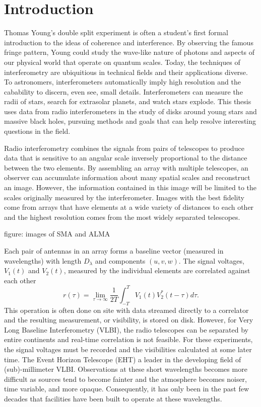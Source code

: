 \chapter{Introduction}\label{chapter:introduction}

Thomas Young's double split experiment is often a student's first formal introduction to the ideas of 
coherence and interference.  By observing the famous fringe pattern, Young could study the wave-like nature of 
photons and aspects of our physical world that operate on quantum scales.  Today, the techniques of interferometry
are ubiquitious in technical fields and their applications diverse.  To astronomers, interferometers automatically
imply high resolution and the cabability to discern, even see, small details.  Interferometers can measure the 
radii of stars, search for extrasolar planets, and watch stars explode. This thesis uses data from radio
interferometers in the study of disks around young stars and massive black holes, pursuing methods and goals
that can help resolve interesting questions in the field.

Radio interferometry combines the signals
from pairs of telescopes to produce data that is sensitive to an angular scale inversely 
proportional to the distance between the two elements.  By assembling an array with multiple 
telescopes, an observer can accumulate information about many spatial scales and reconstruct an image.  However,
the information contained in this image will be limited to the scales originally measured by the interferometer.
Images with the best fidelity come from arrays that have elements at a wide variety of 
distances to each other and the highest resolution comes from the most widely separated telescopes.

figure: images of SMA and ALMA

Each pair of antennas in an array forms a baseline vector (measured in wavelengths) with length $D_\lambda$ and 
components $(u,v,w)$.  The signal voltages, $V_1(t)$ and $V_2(t)$, measured by the individual 
elements are correlated against each other
\begin{equation}
r(\tau) = \lim_{\tau \to \infty} \frac{1}{2T} \int_{-T}^T V_1(t) V_2^\ast(t-\tau) d\tau.
\end{equation}
This operation is often done on site with data streamed directly to a correlator and the resulting 
measurement, or visibility, is stored on disk.  However, for Very Long Baseline Interferometry (VLBI), the 
radio telescopes can be separated by entire continents and real-time correlation is not feasible.  For these
experiments, the signal voltages must be recorded and the visibilities calculated at some later time.  The Event
Horizon Telescope (EHT) a leader in the developing field of (sub)-millimeter VLBI.  Observations at these 
short wavelengths becomes more difficult as sources
tend to become fainter and the atmosphere becomes noiser, time variable, and more opaque.  Consequently, it 
has only been in the past few decades that facilities have been built to operate at these wavelengths.

